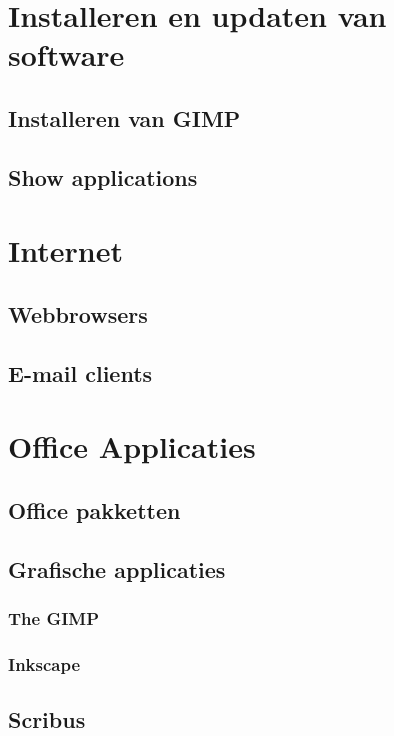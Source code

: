 \documentclass[a4paper,12pt,twoside,openright,titlepage]{book}
\begin{document}
\chapter{Installeren en updaten van software}

\section{Installeren van GIMP}

\section{Show applications}


\chapter{Internet}
\section{Webbrowsers}

\section{E-mail clients}


\chapter{Office Applicaties}
\section{Office pakketten}

\section{Grafische applicaties}

\subsection{The GIMP}

\subsection{Inkscape}

\section{Scribus}

\end{document}
